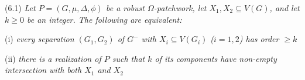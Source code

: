 \stmt
(6.1) \textit{Let $P = (G, \mu, \Delta, \phi)$ be a robust $\Omega$-patchwork, let $X_1, X_2 \subseteq V(G)$, and let $k \ge 0$ be an integer. The following are equivalent:}

\hspace*{12pt}(i) \textit{every separation $(G_1, G_2)$ of $G^-$ with $X_i \subseteq V(G_i)$ ($i = 1, 2$) has order $\ge k$}

\hspace*{12pt}(ii) \textit{there is a realization of $P$ such that $k$ of its components have non-empty intersection with both $X_1$ and $X_2$}
